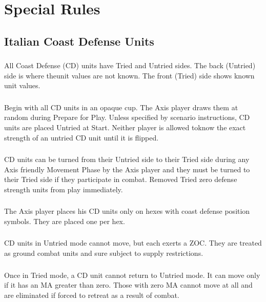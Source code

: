 \section{Special Rules}

\subsection{Italian Coast Defense Units}

\subsubsection{} All Coast Defense (CD) units have Tried and Untried sides. The back (Untried) side is where theunit values are not known. The front (Tried) side shows known unit values.

\subsubsection{} Begin with all CD units in an opaque cup. The Axis player draws them at random during Prepare for Play. Unless specified by scenario instructions, CD units are placed Untried at Start. Neither player is allowed toknow the exact strength of an untried CD unit until it is flipped.

\subsubsection{} CD units can be turned from their Untried side to their Tried side during any Axis friendly Movement Phase by the Axis player and they must be turned to their Tried side if they participate in combat. Removed Tried zero defense strength units from play immediately.

\subsubsection{} The Axis player places his CD units only on hexes with coast defense position symbols. They are placed one per hex.

\subsubsection{} CD units in Untried mode cannot move, but each exerts a ZOC. They are treated as ground combat units and sure subject to supply restrictions.

\subsubsection{} Once in Tried mode, a CD unit cannot return to Untried mode. It can move only if it has an MA greater than zero. Those with zero MA cannot move at all and are eliminated if forced to retreat as a result of combat.

